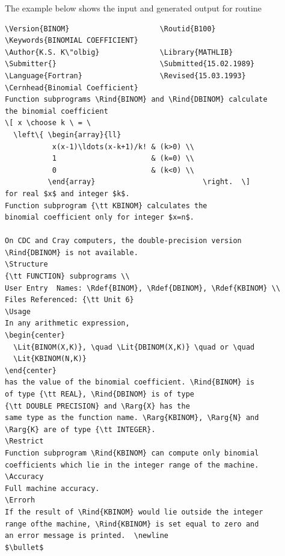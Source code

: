 \documentclass[a4paper,11pt]{cernman}
\begin{document}
\begin{htmlonly}
The example below shows 
the input and generated output for \CERNLIB{} routine 

\begin{verbatim}
\Version{BINOM}                     \Routid{B100}
\Keywords{BINOMIAL COEFFICIENT}
\Author{K.S. K\"olbig}              \Library{MATHLIB}
\Submitter{}                        \Submitted{15.02.1989}
\Language{Fortran}                  \Revised{15.03.1993}
\Cernhead{Binomial Coefficient}
Function subprograms \Rind{BINOM} and \Rind{DBINOM} calculate
the binomial coefficient
\[ x \choose k \ = \ 
  \left\{ \begin{array}{ll}
           x(x-1)\ldots(x-k+1)/k! & (k>0) \\
           1                      & (k=0) \\
           0                      & (k<0) \\
          \end{array}                         \right.  \]
for real $x$ and integer $k$.
Function subprogram {\tt KBINOM} calculates the
binomial coefficient only for integer $x=n$.

On CDC and Cray computers, the double-precision version
\Rind{DBINOM} is not available.
\Structure
{\tt FUNCTION} subprograms \\
User Entry  Names: \Rdef{BINOM}, \Rdef{DBINOM}, \Rdef{KBINOM} \\
Files Referenced: {\tt Unit 6}
\Usage
In any arithmetic expression,
\begin{center}
  \Lit{BINOM(X,K)}, \quad \Lit{DBINOM(X,K)} \quad or \quad
  \Lit{KBINOM(N,K)}
\end{center}
has the value of the binomial coefficient. \Rind{BINOM} is 
of type {\tt REAL}, \Rind{DBINOM} is of type 
{\tt DOUBLE PRECISION} and \Rarg{X} has the
same type as the function name. \Rarg{KBINOM}, \Rarg{N} and 
\Rarg{K} are of type {\tt INTEGER}.
\Restrict
Function subprogram \Rind{KBINOM} can compute only binomial
coefficients which lie in the integer range of the machine.
\Accuracy
Full machine accuracy.
\Errorh
If the result of \Rind{KBINOM} would lie outside the integer 
range ofthe machine, \Rind{KBINOM} is set equal to zero and 
an error message is printed.  \newline
$\bullet$
\end{verbatim}


\end{htmlonly}
\end{document}
